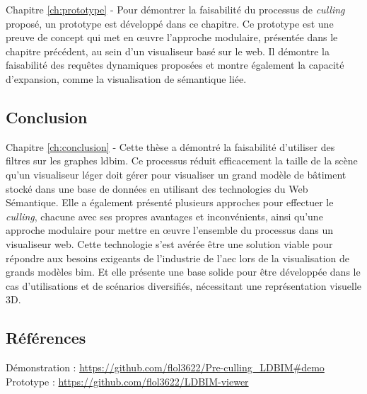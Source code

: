 \begin{refsection}
\begin{multicols}{2}
        \textsf{Chapitre \ref{ch:prototype} -}
        Pour démontrer la faisabilité du processus de \emph{culling} proposé, un prototype est développé dans ce chapitre. Ce prototype est une preuve de concept qui met en œuvre l'approche modulaire, présentée dans le chapitre précédent, au sein d'un visualiseur basé sur le web. Il démontre la faisabilité des requêtes dynamiques proposées et montre également la capacité d'expansion, comme la visualisation de sémantique liée.

        \subsection*{Conclusion}
        \textsf{Chapitre \ref{ch:conclusion} -} Cette thèse a démontré la faisabilité d'utiliser des filtres sur les graphes \ac{ldbim}. Ce processus réduit efficacement la taille de la scène qu'un visualiseur léger doit gérer pour visualiser un grand modèle de bâtiment stocké dans une base de données en utilisant des technologies du Web Sémantique. Elle a également présenté plusieurs approches pour effectuer le \emph{culling}, chacune avec ses propres avantages et inconvénients, ainsi qu'une approche modulaire pour mettre en œuvre l'ensemble du processus dans un visualiseur web. Cette technologie s'est avérée être une solution viable pour répondre aux besoins exigeants de l'industrie de l'\ac{aec} lors de la visualisation de grands modèles \ac{bim}. Et elle présente une base solide pour être développée dans le cas d'utilisations et de scénarios diversifiés, nécessitant une représentation visuelle 3D.
    \end{multicols}
    \subsection*{Références}
    \small
    {\renewcommand*{\bibfont}{\small}
        \printbibliography}

    \textsf{Démonstration :} \url{https://github.com/flol3622/Pre-culling_LDBIM#demo}\\
    \textsf{Prototype :} \url{https://github.com/flol3622/LDBIM-viewer}
\end{refsection}